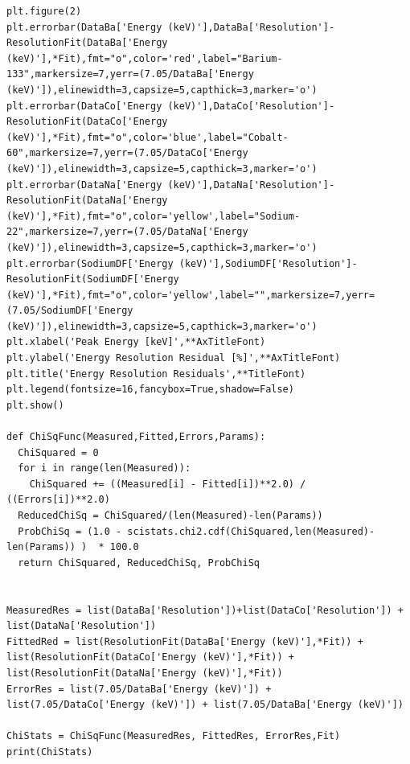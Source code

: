 \documentclass[11pt,a4paper]{article}
\begin{document}
\begin{verbatim}
plt.figure(2)
plt.errorbar(DataBa['Energy (keV)'],DataBa['Resolution']-ResolutionFit(DataBa['Energy (keV)'],*Fit),fmt="o",color='red',label="Barium-133",markersize=7,yerr=(7.05/DataBa['Energy (keV)']),elinewidth=3,capsize=5,capthick=3,marker='o')
plt.errorbar(DataCo['Energy (keV)'],DataCo['Resolution']-ResolutionFit(DataCo['Energy (keV)'],*Fit),fmt="o",color='blue',label="Cobalt-60",markersize=7,yerr=(7.05/DataCo['Energy (keV)']),elinewidth=3,capsize=5,capthick=3,marker='o')
plt.errorbar(DataNa['Energy (keV)'],DataNa['Resolution']-ResolutionFit(DataNa['Energy (keV)'],*Fit),fmt="o",color='yellow',label="Sodium-22",markersize=7,yerr=(7.05/DataNa['Energy (keV)']),elinewidth=3,capsize=5,capthick=3,marker='o')
plt.errorbar(SodiumDF['Energy (keV)'],SodiumDF['Resolution']-ResolutionFit(SodiumDF['Energy (keV)'],*Fit),fmt="o",color='yellow',label="",markersize=7,yerr=(7.05/SodiumDF['Energy (keV)']),elinewidth=3,capsize=5,capthick=3,marker='o')
plt.xlabel('Peak Energy [keV]',**AxTitleFont)
plt.ylabel('Energy Resolution Residual [%]',**AxTitleFont)
plt.title('Energy Resolution Residuals',**TitleFont)
plt.legend(fontsize=16,fancybox=True,shadow=False)
plt.show()

def ChiSqFunc(Measured,Fitted,Errors,Params):
  ChiSquared = 0
  for i in range(len(Measured)):
    ChiSquared += ((Measured[i] - Fitted[i])**2.0) / ((Errors[i])**2.0)
  ReducedChiSq = ChiSquared/(len(Measured)-len(Params))
  ProbChiSq = (1.0 - scistats.chi2.cdf(ChiSquared,len(Measured)-len(Params)) )  * 100.0
  return ChiSquared, ReducedChiSq, ProbChiSq


MeasuredRes = list(DataBa['Resolution'])+list(DataCo['Resolution']) + list(DataNa['Resolution'])
FittedRed = list(ResolutionFit(DataBa['Energy (keV)'],*Fit)) + list(ResolutionFit(DataCo['Energy (keV)'],*Fit)) + list(ResolutionFit(DataNa['Energy (keV)'],*Fit))
ErrorRes = list(7.05/DataBa['Energy (keV)']) + list(7.05/DataCo['Energy (keV)']) + list(7.05/DataBa['Energy (keV)'])

ChiStats = ChiSqFunc(MeasuredRes, FittedRes, ErrorRes,Fit)
print(ChiStats)
\end{verbatim}
\end{document}
